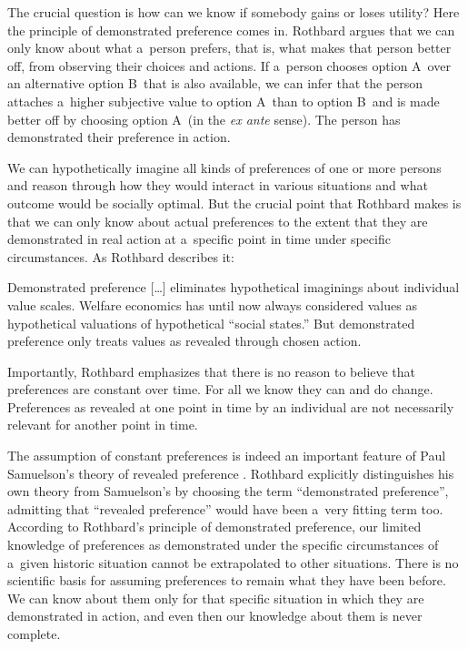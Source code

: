 The crucial question is how can we know if somebody gains or loses utility? Here the principle of demonstrated preference comes in. Rothbard argues that we can only know about what a~person prefers, that is, what makes that person better off, from observing their choices and actions. If a~person chooses option A~over an alternative option B~that is also available, we can infer that the person attaches a~higher subjective value to option A~than to option B~and is made better off by choosing option A~(in the \textit{ex ante} sense). The person has demonstrated their preference in action.



We can hypothetically imagine all kinds of preferences of one or more persons and reason through how they would interact in various situations and what outcome would be socially optimal. But the crucial point that Rothbard makes is that we can only know about actual preferences to the extent that they are demonstrated in real action at a~specific point in time under specific circumstances. As Rothbard 
\parencite*[][p.320]{rothbard_toward_2011} %
 describes it:



Demonstrated preference […] eliminates hypothetical imaginings about individual value scales. Welfare economics has until now always considered values as hypothetical valuations of hypothetical ``social states.'' But demonstrated preference only treats values as revealed through chosen action.



Importantly, Rothbard emphasizes that there is no reason to believe that preferences are constant over time. For all we know they can and do change. Preferences as revealed at one point in time by an individual are not necessarily relevant for another point in time.



The assumption of constant preferences is indeed an important feature of Paul Samuelson's theory of revealed preference 
\parencite[][]{samuelson_empirical_1938}. %
 Rothbard explicitly distinguishes his own theory from Samuelson's by choosing the term ``demonstrated preference'', admitting that ``revealed preference'' would have been a~very fitting term too. According to Rothbard's principle of demonstrated preference, our limited knowledge of preferences as demonstrated under the specific circumstances of a~given historic situation cannot be extrapolated to other situations. There is no scientific basis for assuming preferences to remain what they have been before. We can know about them only for that specific situation in which they are demonstrated in action, and even then our knowledge about them is never complete.



